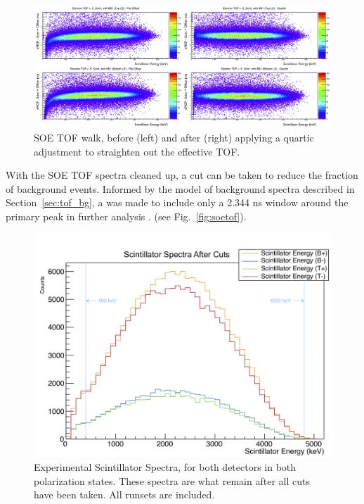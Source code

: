 \begin{figure}[h!!!!tb]
	\centering
	\includegraphics[width=.999\linewidth]
	{Figures/WalkAdjust.png}
	\caption{SOE TOF walk, before (left) and after (right) applying a quartic adjustment to straighten out the effective TOF.}	
	\label{fig:WalkAdjust}
\end{figure}

With the SOE TOF spectra cleaned up, a cut can be taken to reduce the fraction of background events.  Informed by the model of background spectra described in Section~\ref{sec:tof_bg}, a was made to include only a 2.344 ns window around the primary peak in further analysis . (see Fig.~\ref{fig:soetof}).




\begin{figure}[h!!!!tb]
	\centering
	\includegraphics[width=.999\linewidth]
	{Figures/experimental_scintspectra_lin.png}
	\caption[Experimental Scintillator Spectra]{Experimental Scintillator Spectra, for both detectors in both polarization states.  These spectra are what remain after all cuts have been taken.  All runsets are included.}	
	\label{fig:scintspectra}
\end{figure}



